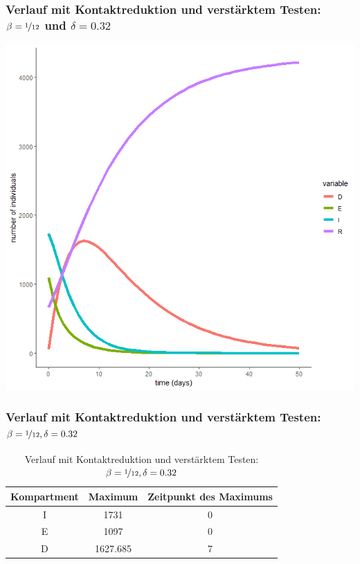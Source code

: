 \documentclass{beamer}
\begin{document}
\begin{frame}
	\frametitle{Verlauf mit Kontaktreduktion und verstärktem Testen: $\beta = \nicefrac{1}{12}$ und $\delta = 0.32$}
	\begin{center}
		\includegraphics[scale=0.45]{delta=0,32,beta=1durch12,ohne_s.png}
	\end{center}
\end{frame}

\begin{frame}
	\frametitle{Verlauf mit Kontaktreduktion und verstärktem Testen: $\beta = \nicefrac{1}{12}, \delta = 0.32$}
	\begin{table}[h]
		\caption{Verlauf mit Kontaktreduktion und verstärktem Testen: $\beta = \nicefrac{1}{12}, \delta = 0.32$}
		\centering
		\begin{tabular}{@{}ccc@{}}
			\toprule
			Kompartment & Maximum & Zeitpunkt des Maximums\\ 
			\midrule
			I & 1731 & 0\\ 
			E & 1097 & 0\\ 
			D & 1627.685 & 7\\ 
			\bottomrule
		\end{tabular}
	\end{table}
\end{frame}
\end{document}
